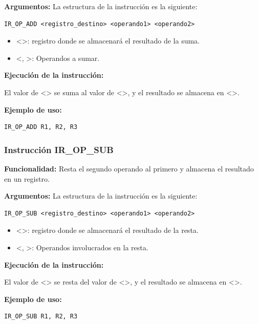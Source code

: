 \noindent
\textbf{Argumentos:} La estructura de la instrucción es la siguiente:
\begin{verbatim}
IR_OP_ADD <registro_destino> <operando1> <operando2>
\end{verbatim}
\begin{itemize}
    \item <>: registro donde se almacenará el resultado de la suma.
    \item <, >: Operandos a sumar.
\end{itemize}

\noindent
\textbf{Ejecución de la instrucción:}


\noindent
El valor de <> se suma al valor de <>, y el resultado se almacena en <>.


\noindent
\textbf{Ejemplo de uso:}
\begin{verbatim}
IR_OP_ADD R1, R2, R3
\end{verbatim}

\newpage

\subsubsection{Instrucción IR\_OP\_SUB}\label{subsubsec:IR_OP_SUB}
\noindent
\textbf{Funcionalidad:} Resta el segundo operando al primero y almacena el resultado en un registro.

\noindent
\textbf{Argumentos:} La estructura de la instrucción es la siguiente:
\begin{verbatim}
IR_OP_SUB <registro_destino> <operando1> <operando2>
\end{verbatim}
\begin{itemize}
    \item <>: registro donde se almacenará el resultado de la resta.
    \item <, >: Operandos involucrados en la resta.
\end{itemize}

\noindent
\textbf{Ejecución de la instrucción:}
\vspace{0.3cm}

\noindent
El valor de <> se resta del valor de <>, y el resultado se almacena en <>.
\vspace{0.3cm}

\noindent
\textbf{Ejemplo de uso:}
\begin{verbatim}
IR_OP_SUB R1, R2, R3
\end{verbatim}

